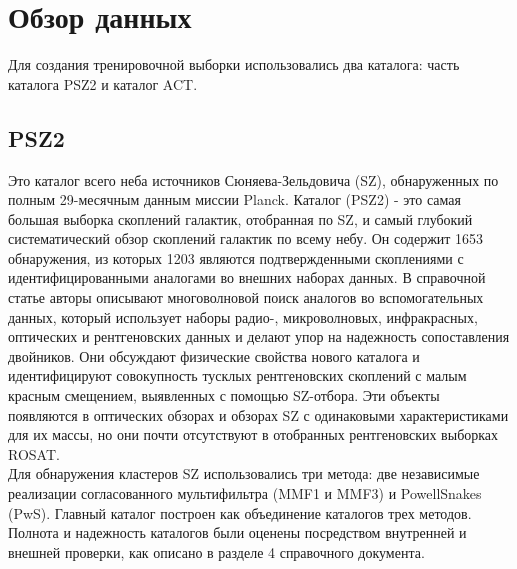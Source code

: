 \chapter{Обзор данных}
\label{cha:ch_2}

Для создания тренировочной выборки использовались два каталога: часть каталога PSZ2 и каталог ACT.\\

\section{PSZ2}
\cite{Planck} Это каталог всего неба источников Сюняева-Зельдовича (SZ), обнаруженных 
по полным 29-месячным данным миссии Planck. Каталог (PSZ2) - это самая большая выборка скоплений 
галактик, отобранная по SZ, и самый глубокий систематический обзор скоплений галактик по всему 
небу. Он содержит 1653 обнаружения, из которых 1203 являются подтвержденными скоплениями с
идентифицированными аналогами во внешних наборах данных. В справочной статье авторы описывают 
многоволновой поиск аналогов во вспомогательных данных, который использует наборы радио-, 
микроволновых, инфракрасных, оптических и рентгеновских данных и делают упор на надежность 
сопоставления двойников. Они обсуждают физические свойства нового каталога и идентифицируют 
совокупность тусклых рентгеновских скоплений с малым красным смещением, выявленных с помощью 
SZ-отбора. Эти объекты появляются в оптических обзорах и обзорах SZ с одинаковыми характеристиками 
для их массы, но они почти отсутствуют в отобранных рентгеновских выборках ROSAT.\\

Для обнаружения кластеров SZ использовались три метода: две независимые реализации согласованного мультифильтра (MMF1 и MMF3) и PowellSnakes (PwS). Главный каталог построен как объединение 
каталогов трех методов. Полнота и надежность каталогов были оценены посредством внутренней и 
внешней проверки, как описано в разделе 4 справочного документа.\\

